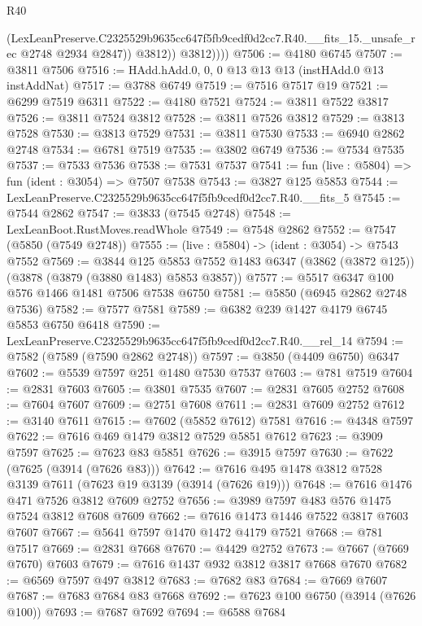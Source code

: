 \begin{lexlean}{R40}
\begin{coremodule}
                  (LexLeanPreserve.C2325529b9635cc647f5fb9cedf0d2cc7.R40.__fits_15._unsafe_rec
                    @2748
                    @2934
                    @2847))
                @3812))
            @3812))))
@7506 := @4180 @6745
@7507 := @3811 @7506
@7516 := HAdd.hAdd.{0, 0, 0} @13 @13 @13 (instHAdd.{0} @13 instAddNat)
@7517 := @3788 @6749
@7519 := @7516 @7517 @19
@7521 := @6299 @7519 @6311
@7522 := @4180 @7521
@7524 := @3811 @7522 @3817
@7526 := @3811 @7524 @3812
@7528 := @3811 @7526 @3812
@7529 := @3813 @7528
@7530 := @3813 @7529
@7531 := @3811 @7530
@7533 := @6940 @2862 @2748
@7534 := @6781 @7519
@7535 := @3802 @6749
@7536 := @7534 @7535
@7537 := @7533 @7536
@7538 := @7531 @7537
@7541 := fun (live : @5804) => fun (ident : @3054) => @7507 @7538
@7543 := @3827 @125 @5853
@7544 := LexLeanPreserve.C2325529b9635cc647f5fb9cedf0d2cc7.R40.__fits_5
@7545 := @7544 @2862
@7547 := @3833 (@7545 @2748)
@7548 := LexLeanBoot.RustMoves.readWhole
@7549 := @7548 @2862
@7552 := @7547 (@5850 (@7549 @2748))
@7555 := (live : @5804) -> (ident : @3054) -> @7543 @7552
@7569 := @3844
    @125
    @5853
    @7552
    @1483
    @6347
    (@3862 (@3872 @125))
    (@3878 (@3879 (@3880 @1483) @5853 @3857))
@7577 := @5517 @6347 @100 @576 @1466 @1481 @7506 @7538 @6750
@7581 := @5850 (@6945 @2862 @2748 @7536)
@7582 := @7577 @7581
@7589 := @6382 @239 @1427 @4179 @6745 @5853 @6750 @6418
@7590 := LexLeanPreserve.C2325529b9635cc647f5fb9cedf0d2cc7.R40.__rel_14
@7594 := @7582 (@7589 (@7590 @2862 @2748))
@7597 := @3850 (@4409 @6750) @6347
@7602 := @5539 @7597 @251 @1480 @7530 @7537
@7603 := @781 @7519
@7604 := @2831 @7603
@7605 := @3801 @7535
@7607 := @2831 @7605 @2752
@7608 := @7604 @7607
@7609 := @2751 @7608
@7611 := @2831 @7609 @2752
@7612 := @3140 @7611
@7615 := @7602 (@5852 @7612) @7581
@7616 := @4348 @7597
@7622 := @7616 @469 @1479 @3812 @7529 @5851 @7612
@7623 := @3909 @7597
@7625 := @7623 @83 @5851
@7626 := @3915 @7597
@7630 := @7622 (@7625 (@3914 (@7626 @83)))
@7642 := @7616 @495 @1478 @3812 @7528 @3139 @7611 (@7623 @19 @3139 (@3914 (@7626 @19)))
@7648 := @7616 @1476 @471 @7526 @3812 @7609 @2752
@7656 := @3989 @7597 @483 @576 @1475 @7524 @3812 @7608 @7609
@7662 := @7616 @1473 @1446 @7522 @3817 @7603 @7607
@7667 := @5641 @7597 @1470 @1472 @4179 @7521
@7668 := @781 @7517
@7669 := @2831 @7668
@7670 := @4429 @2752
@7673 := @7667 (@7669 @7670) @7603
@7679 := @7616 @1437 @932 @3812 @3817 @7668 @7670
@7682 := @6569 @7597 @497 @3812
@7683 := @7682 @83
@7684 := @7669 @7607
@7687 := @7683 @7684 @83 @7668
@7692 := @7623 @100 @6750 (@3914 (@7626 @100))
@7693 := @7687 @7692
@7694 := @6588 @7684

\end{coremodule}
\end{lexlean}

